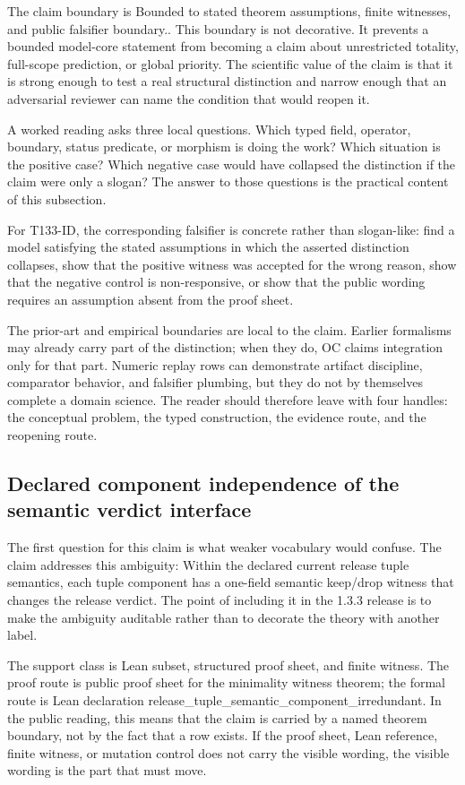 The claim boundary is Bounded to stated theorem assumptions, finite witnesses, and public falsifier boundary.. This boundary is not decorative. It prevents a bounded model-core statement from becoming a claim about unrestricted totality, full-scope prediction, or global priority. The scientific value of the claim is that it is strong enough to test a real structural distinction and narrow enough that an adversarial reviewer can name the condition that would reopen it.

A worked reading asks three local questions. Which typed field, operator, boundary, status predicate, or morphism is doing the work? Which situation is the positive case? Which negative case would have collapsed the distinction if the claim were only a slogan? The answer to those questions is the practical content of this subsection.

For T133-ID, the corresponding falsifier is concrete rather than slogan-like: find a model satisfying the stated assumptions in which the asserted distinction collapses, show that the positive witness was accepted for the wrong reason, show that the negative control is non-responsive, or show that the public wording requires an assumption absent from the proof sheet.

The prior-art and empirical boundaries are local to the claim. Earlier formalisms may already carry part of the distinction; when they do, OC claims integration only for that part. Numeric replay rows can demonstrate artifact discipline, comparator behavior, and falsifier plumbing, but they do not by themselves complete a domain science. The reader should therefore leave with four handles: the conceptual problem, the typed construction, the evidence route, and the reopening route.

\subsection{Declared component independence of the semantic verdict interface}
The first question for this claim is what weaker vocabulary would confuse. The claim addresses this ambiguity: Within the declared current release tuple semantics, each tuple component has a one-field semantic keep/drop witness that changes the release verdict. The point of including it in the 1.3.3 release is to make the ambiguity auditable rather than to decorate the theory with another label.

The support class is Lean subset, structured proof sheet, and finite witness. The proof route is public proof sheet for the minimality witness theorem; the formal route is Lean declaration release\_tuple\_semantic\_component\_irredundant. In the public reading, this means that the claim is carried by a named theorem boundary, not by the fact that a row exists. If the proof sheet, Lean reference, finite witness, or mutation control does not carry the visible wording, the visible wording is the part that must move.

